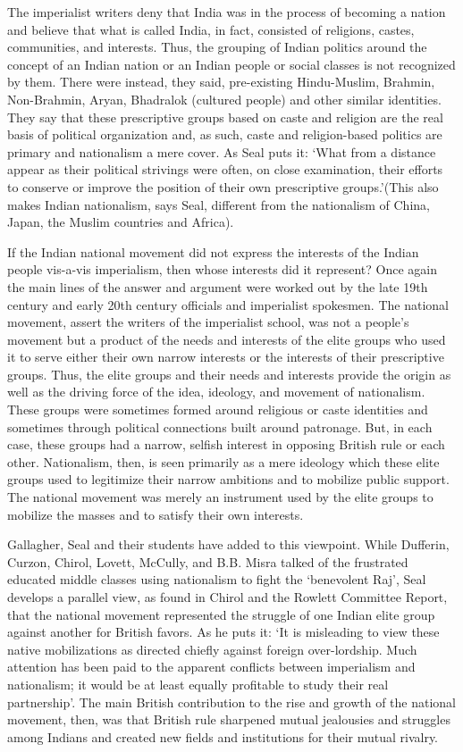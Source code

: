 The imperialist writers deny that India was in the process of becoming a nation and believe that what is called India, in fact, consisted of religions, castes, communities, and interests. Thus, the grouping of Indian politics around the concept of an Indian nation or an Indian people or social classes is not recognized by them. There were instead, they said, pre-existing Hindu-Muslim, Brahmin, Non-Brahmin, Aryan, Bhadralok (cultured people) and other similar identities. They say that these prescriptive groups based on caste and religion are the real basis of political organization and, as such, caste and religion-based politics are primary and nationalism a mere cover. As Seal puts it: `What from a distance appear as their political strivings were often, on close examination, their efforts to conserve or improve the position of their own prescriptive groups.'(This also makes Indian nationalism, says Seal, different from the nationalism of China, Japan, the Muslim countries and Africa).

If the Indian national movement did not express the interests of the Indian people vis-a-vis imperialism, then whose interests did it represent? Once again the main lines of the answer and argument were worked out by the late 19th century and early 20th century officials and imperialist spokesmen. The national movement, assert the writers of the imperialist school, was not a people's movement but a product of the needs and interests of the elite groups who used it to serve either their own narrow interests or the interests of their prescriptive groups. Thus, the elite groups and their needs and interests provide the origin as well as the driving force of the idea, ideology, and movement of nationalism. These groups were sometimes formed around religious or caste identities and sometimes through political connections built around patronage. But, in each case, these groups had a narrow, selfish interest in opposing British rule or each other. Nationalism, then, is seen primarily as a mere ideology which these elite groups used to legitimize their narrow ambitions and to mobilize public support. The national movement was merely an instrument used by the elite groups to mobilize the masses and to satisfy their own interests.

Gallagher, Seal and their students have added to this viewpoint. While Dufferin, Curzon, Chirol, Lovett, McCully, and B.B. Misra talked of the frustrated educated middle classes using nationalism to fight the `benevolent Raj', Seal develops a parallel view, as found in Chirol and the Rowlett Committee Report, that the national movement represented the struggle of one Indian elite group against another for British favors. As he puts it: `It is misleading to view these native mobilizations as directed chiefly against foreign over-lordship. Much attention has been paid to the apparent conflicts between imperialism and nationalism; it would be at least equally profitable to study their real partnership'. The main British contribution to the rise and growth of the national movement, then, was that British rule sharpened mutual jealousies and struggles among Indians and created new fields and institutions for their mutual rivalry.

